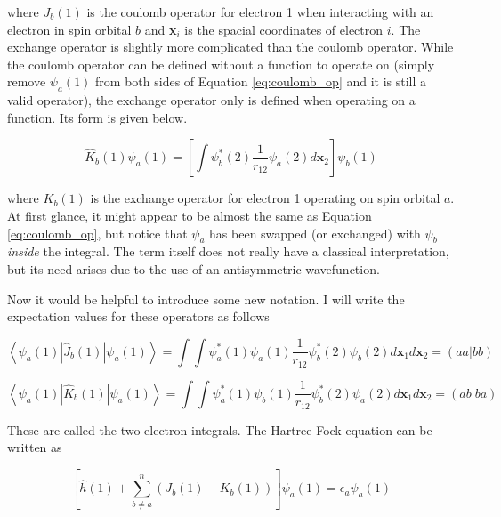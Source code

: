 \documentclass[12pt]{report}
\begin{document}
where $J_{b}(1)$ is the coulomb operator for electron 1 when interacting with an electron in spin orbital $b$ and \textbf{x}$_{i}$ is the spacial coordinates of electron $i$. The exchange operator is slightly more complicated than the coulomb operator. While the coulomb operator can be defined without a function to operate on (simply remove $\psi_{a}(1)$ from both sides of Equation \ref{eq:coulomb_op} and it is still a valid operator), the exchange operator only is defined when operating on a function. Its form is given below.

\begin{equation}
\label{eq:exchange_op}
\hat{K}_{b}(1)\psi_{a}(1)=\left[\int\psi^{*}_{b}(2)\frac{1}{r_{12}}\psi_{a}(2)d\textbf{x}_{2}\right]\psi_{b}(1)
\end{equation} 

where $K_{b}(1)$ is the exchange operator for electron 1 operating on spin orbital $a$. At first glance, it might appear to be almost the same as Equation \ref{eq:coulomb_op}, but notice that $\psi_{a}$ has been swapped (or exchanged) with $\psi_{b}$ \textit{inside} the integral. The term itself does not really have a classical interpretation, but its need arises due to the use of an antisymmetric wavefunction.

Now it would be helpful to introduce some new notation. I will write the expectation values for these operators as follows

\begin{equation}
\label{eq:coulomb_op_ex}
\left<\psi_{a}(1)|\hat{J}_{b}(1)|\psi_{a}(1)\right>=\int\int\psi^{*}_{a}(1)\psi_{a}(1)\frac{1}{r_{12}}\psi^{*}_{b}(2)\psi_{b}(2)d\textbf{x}_{1}d\textbf{x}_{2}
=\left(aa|bb\right)
\end{equation} 

\begin{equation}
\label{eq:exchange_op_ex}
\left<\psi_{a}(1)|\hat{K}_{b}(1)|\psi_{a}(1)\right>=\int\int\psi^{*}_{a}(1)\psi_{b}(1)\frac{1}{r_{12}}\psi^{*}_{b}(2)\psi_{a}(2)d\textbf{x}_{1}d\textbf{x}_{2}
=\left(ab|ba\right)
\end{equation}

These are called the two-electron integrals. The Hartree-Fock equation can be written as 

 \begin{equation}
\label{eq:hartree-fock_eq}
\left[\hat{h}(1) + \sum^{n}_{b\neq a}\left(J_{b}(1)- K_{b}(1)\right)\right]\psi_{a}(1) = \epsilon_{a}\psi_{a}(1)
\end{equation}
\end{document}
